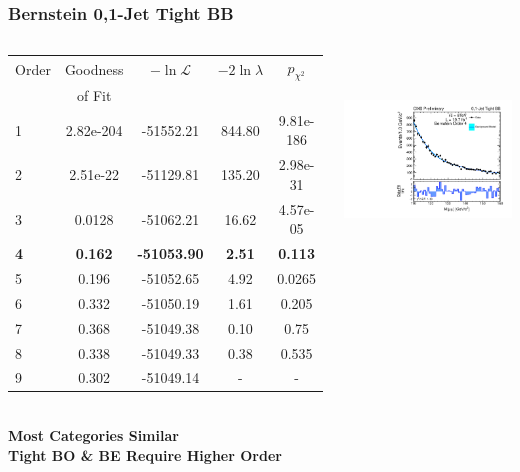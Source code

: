 \documentclass{beamer}
\begin{document}
\begin{frame}
\frametitle{Bernstein 0,1-Jet Tight BB}
  \begin{columns}[c]
   \column{60mm}
      \begin{center}
      \tiny
\begin{tabular}{|l|c|c|c|c|} \hline
Order & Goodness & $-\ln\mathcal{L}$ & $-2\ln\lambda$ & $p_{\chi^2}$ \\ 
 & of Fit  &  & &  \\ \hline \hline
1 & 2.82e-204 & -51552.21 & 844.80 & 9.81e-186  \\ \hline
2 & 2.51e-22 & -51129.81 & 135.20 & 2.98e-31  \\ \hline
3 & 0.0128 & -51062.21 & 16.62 & 4.57e-05  \\ \hline
\bf 4 & \bf 0.162 & \bf -51053.90 & \bf 2.51 & \bf 0.113  \\ \hline
5 & 0.196 & -51052.65 & 4.92 & 0.0265  \\ \hline
6 & 0.332 & -51050.19 & 1.61 & 0.205  \\ \hline
7 & 0.368 & -51049.38 & 0.10 & 0.75  \\ \hline
8 & 0.338 & -51049.33 & 0.38 & 0.535  \\ \hline
9 & 0.302 & -51049.14 & - & -  \\ \hline
\end{tabular}
\\
\normalsize
\vspace{2em}
\bf
Most Categories Similar
\\
Tight BO \& BE Require Higher Order
      \end{center}
   \column{60mm}
      \begin{center}
        \includegraphics[height=55mm]{wholeRangeHggStudy1/plotsOrderStudyPolysLowOrders/order_Shape_Jets01PassPtG10BB_Bernstein4}
      \end{center}
  \end{columns}
  \begin{center}
  \end{center}
\end{frame}
\end{document}
